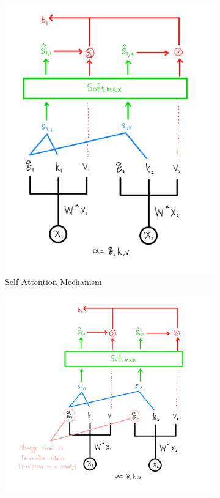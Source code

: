 \begin{figure}[ht]
    \centering
    \begin{subfigure}[b]{0.35\textwidth}
        \centering
        \includegraphics[width=\textwidth]{Figures/selfattention.jpeg}
        \caption{Self-Attention Mechanism}
        \label{fig:self_attention}
    \end{subfigure}
    \hfill
    \begin{subfigure}[b]{0.45\textwidth}
        \centering
        \includegraphics[width=\textwidth]{Figures/meanfield.jpeg}

\end{subfigure}
\end{figure}
